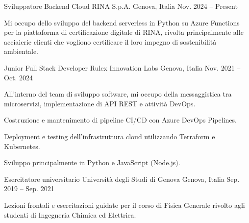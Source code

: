 


\begin{cventries}


\cventry
{Sviluppatore Backend Cloud} %
{RINA S.p.A.} %
{Genova, Italia} %
{Nov. 2024 -- Present} %
{ %
\begin{cvitems}
  \item {Mi occupo dello sviluppo del backend serverless in Python su Azure Functions per la piattaforma di certificazione digitale di RINA, rivolta principalmente alle acciaierie clienti che vogliono certificare il loro impegno di sostenibilità ambientale.}
\end{cvitems}
}


\cventry
{Junior Full Stack Developer} %
{Rulex Innovation Labs} %
{Genova, Italia} %
{Nov. 2021 -- Oct. 2024} %
{ %
\begin{cvitems}
\item {All'interno del team di sviluppo software, mi occupo della messaggistica tra microservizi, implementazione di API REST e attività DevOps.}
\item {Costruzione e mantenimento di pipeline CI/CD con Azure DevOps Pipelines.}
\item {Deployment e testing dell'infrastruttura cloud utilizzando Terraform e Kubernetes.}
\item {Sviluppo principalmente in Python e JavaScript (Node.js).}
\end{cvitems}
}


\cventry
{Esercitatore universitario} %
{Università degli Studi di Genova} %
{Genova, Italia} %
{Sep. 2019 -- Sep. 2021} %
{ %
\begin{cvitems}
\item {Lezioni frontali e esercitazioni guidate per il corso di Fisica Generale rivolto agli studenti di Ingegneria Chimica ed Elettrica.}
\end{cvitems}
}


\end{cventries}
